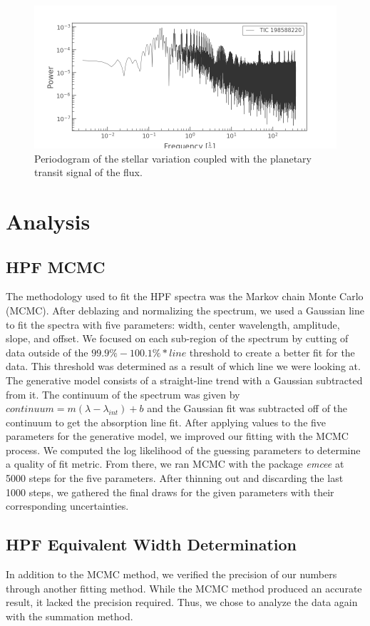\documentclass{aastex631}
\begin{document}
\begin{figure}
    \includegraphics[width=\linewidth]{figures/planetary_periodogram.png}
    \caption{Periodogram of the stellar variation coupled with the planetary transit signal of the flux. }
    \label{fig:planetary_periodogram}
\end{figure}

\section{Analysis}
\subsection{HPF MCMC}
The methodology used to fit the HPF spectra was the Markov chain Monte Carlo (MCMC). After deblazing and normalizing the spectrum, we used a Gaussian line to fit the spectra with five parameters: width, center wavelength, amplitude, slope, and offset.  We focused on each sub-region of the spectrum by cutting of data outside of the $99.9\%-100.1\%*line$ threshold to create a better fit for the data. This threshold was determined as a result of which line we were looking at. The generative model consists of a straight-line trend with a Gaussian subtracted from it. The continuum of the spectrum was given by $continuum=m(\lambda-\lambda_{int})+b$ and the Gaussian fit was subtracted off of the continuum to get the absorption line fit. After applying values to the five parameters for the generative model, we improved our fitting with the MCMC process. We computed the log likelihood of the guessing parameters to determine a quality of fit metric. From there, we ran MCMC with the package \textit{emcee} at 5000 steps for the five parameters. After thinning out and discarding the last 1000 steps, we gathered the final draws for the given parameters with their corresponding uncertainties.

\subsection{HPF Equivalent Width Determination}
In addition to the MCMC method, we verified the precision of our numbers through another fitting method. While the MCMC method produced an accurate result, it lacked the precision required. Thus, we chose to analyze the data again with the summation method.
\end{document}
